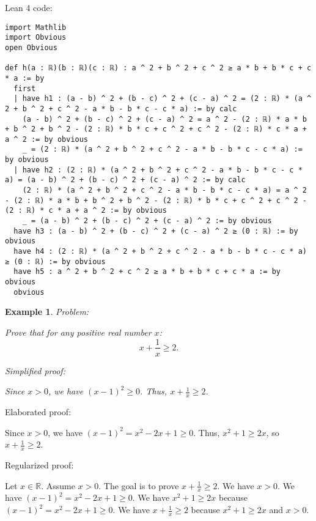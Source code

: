 \documentclass{article}
\newtheorem{example}{Example}
\begin{document}
Lean 4 code:
\begin{tcolorbox}[colback=white!10, width=\linewidth]
\begin{lstlisting}[language=Lean4]
import Mathlib
import Obvious
open Obvious

def h(a : ℝ)(b : ℝ)(c : ℝ) : a ^ 2 + b ^ 2 + c ^ 2 ≥ a * b + b * c + c * a := by
  first
  | have h1 : (a - b) ^ 2 + (b - c) ^ 2 + (c - a) ^ 2 = (2 : ℝ) * (a ^ 2 + b ^ 2 + c ^ 2 - a * b - b * c - c * a) := by calc
    (a - b) ^ 2 + (b - c) ^ 2 + (c - a) ^ 2 = a ^ 2 - (2 : ℝ) * a * b + b ^ 2 + b ^ 2 - (2 : ℝ) * b * c + c ^ 2 + c ^ 2 - (2 : ℝ) * c * a + a ^ 2 := by obvious
    _ = (2 : ℝ) * (a ^ 2 + b ^ 2 + c ^ 2 - a * b - b * c - c * a) := by obvious
  | have h2 : (2 : ℝ) * (a ^ 2 + b ^ 2 + c ^ 2 - a * b - b * c - c * a) = (a - b) ^ 2 + (b - c) ^ 2 + (c - a) ^ 2 := by calc
    (2 : ℝ) * (a ^ 2 + b ^ 2 + c ^ 2 - a * b - b * c - c * a) = a ^ 2 - (2 : ℝ) * a * b + b ^ 2 + b ^ 2 - (2 : ℝ) * b * c + c ^ 2 + c ^ 2 - (2 : ℝ) * c * a + a ^ 2 := by obvious
    _ = (a - b) ^ 2 + (b - c) ^ 2 + (c - a) ^ 2 := by obvious
  have h3 : (a - b) ^ 2 + (b - c) ^ 2 + (c - a) ^ 2 ≥ (0 : ℝ) := by obvious
  have h4 : (2 : ℝ) * (a ^ 2 + b ^ 2 + c ^ 2 - a * b - b * c - c * a) ≥ (0 : ℝ) := by obvious
  have h5 : a ^ 2 + b ^ 2 + c ^ 2 ≥ a * b + b * c + c * a := by obvious
  obvious

\end{lstlisting}
\end{tcolorbox}


\begin{example}
Problem:
\begin{tcolorbox}[colback=yellow!10, width=\linewidth]
Prove that for any positive real number $x$:
    $$x + \frac{1}{x} \geq 2.$$
\end{tcolorbox}

Simplified proof:
\begin{tcolorbox}[colback=blue!10, width=\linewidth]
Since $x>0$, we have $(x-1)^2 \ge 0$. Thus, $x + \frac{1}{x} \ge 2$.
\end{tcolorbox}
\end{example}

Elaborated proof:
\begin{tcolorbox}[colback=green!10, width=\linewidth]
Since $x>0$, we have $(x-1)^2 = x^2 - 2x + 1 \ge 0$. Thus, $x^2 + 1 \ge 2x$, so $x + \frac{1}{x} \ge 2$.
\end{tcolorbox}

Regularized proof:
\begin{tcolorbox}[colback=red!10, width=\linewidth]
Let $x\in\mathbb{R}$.
Assume $x > 0$.
The goal is to prove $x + \frac{1}{x} \ge 2$.
We have $x>0$.
We have ${(x-1)}^2 = x^2 - 2x + 1 \ge 0$.
We have $x^2 + 1 \ge 2x$ because ${(x-1)}^2 = x^2 - 2x + 1 \ge 0$.
We have $x + \frac{1}{x} \ge 2$ because $x^2 + 1 \ge 2x$ and $x>0$.
\end{tcolorbox}
\end{document}
